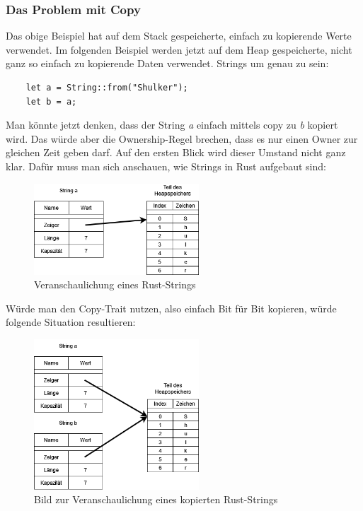\subsubsection{Das Problem mit Copy}
Das obige Beispiel hat auf dem Stack gespeicherte, einfach zu kopierende Werte verwendet. Im folgenden Beispiel werden jetzt auf dem Heap gespeicherte,
nicht ganz so einfach zu kopierende Daten verwendet. Strings um genau zu sein:
\begin{lstlisting}
    let a = String::from("Shulker");
    let b = a;
\end{lstlisting}
Man könnte jetzt denken, dass der String \textit{a} einfach mittels copy zu \textit{b} kopiert wird. Das würde aber die Ownership-Regel brechen, dass
es nur einen Owner zur gleichen Zeit geben darf. Auf den ersten Blick wird dieser Umstand nicht ganz klar. Dafür muss man sich anschauen, wie Strings
in Rust aufgebaut sind:
\begin{figure}[H]
    \begin{center}
        \includegraphics[width=0.55\textwidth]{images/rust/string_repr.png}
        \caption{Veranschaulichung eines Rust-Strings}
    \end{center}
\end{figure}
Würde man den Copy-Trait nutzen, also einfach Bit für Bit kopieren, würde folgende Situation resultieren:
\begin{figure}[H]
    \begin{center}
        \includegraphics[width=0.55\textwidth]{images/rust/string_copy_repr.png}
        \caption{Bild zur Veranschaulichung eines kopierten Rust-Strings}
    \end{center}
\end{figure}
